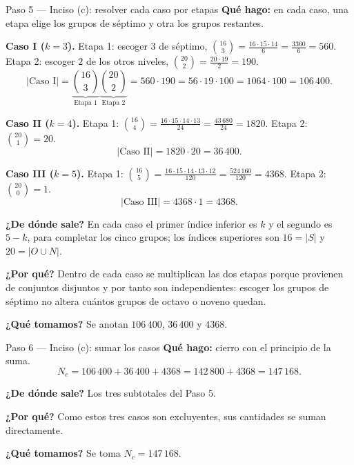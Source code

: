 \documentclass[11pt]{article}
\begin{document}
\begin{paso}{Paso 5 --- Inciso (c): resolver cada caso por etapas}
\textbf{Qué hago:} en cada caso, una etapa elige los grupos de séptimo y otra los grupos restantes.

\medskip
\textbf{Caso I ($k=3$).} Etapa 1: escoger $3$ de séptimo, $\binom{16}{3}=\frac{16\cdot 15\cdot 14}{6}=\frac{3360}{6}=560$. Etapa 2: escoger $2$ de los otros niveles, $\binom{20}{2}=\frac{20\cdot 19}{2}=190$.
\[
  |\text{Caso I}| = \underbrace{\binom{16}{3}}_{\text{Etapa 1}}\underbrace{\binom{20}{2}}_{\text{Etapa 2}} = 560\cdot 190 = 56\cdot 19\cdot 100 = 1064\cdot 100 = 106\,400 .
\]

\textbf{Caso II ($k=4$).} Etapa 1: $\binom{16}{4}=\frac{16\cdot 15\cdot 14\cdot 13}{24}=\frac{43\,680}{24}=1820$. Etapa 2: $\binom{20}{1}=20$.
\[
  |\text{Caso II}| = 1820\cdot 20 = 36\,400 .
\]

\textbf{Caso III ($k=5$).} Etapa 1: $\binom{16}{5}=\frac{16\cdot 15\cdot 14\cdot 13\cdot 12}{120}=\frac{524\,160}{120}=4368$. Etapa 2: $\binom{20}{0}=1$.
\[
  |\text{Caso III}| = 4368\cdot 1 = 4368 .
\]

\textbf{¿De dónde sale?} En cada caso el primer índice inferior es $k$ y el segundo es $5-k$, para completar los cinco grupos; los índices superiores son $16=|S|$ y $20=|O\cup N|$.

\textbf{¿Por qué?} Dentro de cada caso se multiplican las dos etapas porque provienen de conjuntos disjuntos y por tanto son independientes: escoger los grupos de séptimo no altera cuántos grupos de octavo o noveno quedan.

\textbf{¿Qué tomamos?} Se anotan $106\,400$, $36\,400$ y $4368$.
\end{paso}

\begin{paso}{Paso 6 --- Inciso (c): sumar los casos}
\textbf{Qué hago:} cierro con el principio de la suma.
\[
  N_c = 106\,400 + 36\,400 + 4368 = 142\,800 + 4368 = 147\,168 .
\]

\textbf{¿De dónde sale?} Los tres subtotales del Paso 5.

\textbf{¿Por qué?} Como estos tres casos son excluyentes, sus cantidades se suman directamente.

\textbf{¿Qué tomamos?} Se toma $N_c = 147\,168$.
\end{paso}
\end{document}
